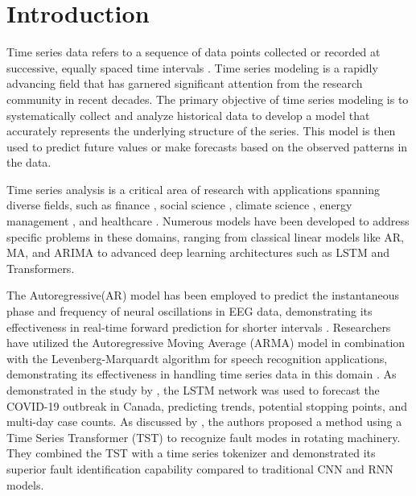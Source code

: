 \documentclass[sn-mathphys-num]{sn-jnl}
\theoremstyle{thmstyleone}%
\theoremstyle{thmstyletwo}%
\theoremstyle{thmstylethree}%
\begin{document}

\maketitle

\section{Introduction}\label{sec1}
Time series data refers to a sequence of data points collected or recorded at successive, equally spaced time intervals  \cite{adhikari2013introductory}. Time series modeling is a rapidly advancing field that has garnered significant attention from the research community in recent decades. The primary objective of time series modeling is to systematically collect and analyze historical data to develop a model that accurately represents the underlying structure of the series. This model is then used to predict future values or make forecasts based on the observed patterns in the data. 

Time series analysis is a critical area of research with applications spanning diverse fields, such as finance \cite{kim2011time}, social science \cite{box2014time}, climate science \cite{mudelsee2010climate}, energy management \cite{chou2018forecasting}, and healthcare \cite{gao2020time}. Numerous models have been developed to address specific problems in these domains, ranging from classical linear models like AR, MA, and ARIMA to advanced deep learning architectures such as LSTM and Transformers. 

The Autoregressive(AR) model has been employed to predict the instantaneous phase and frequency of neural oscillations in EEG data, demonstrating its effectiveness in real-time forward prediction for shorter intervals \cite{shakeel2020time}. Researchers have utilized the Autoregressive Moving Average (ARMA) model in combination with the Levenberg-Marquardt algorithm for speech recognition applications, demonstrating its effectiveness in handling time series data in this domain \cite{jafari2024speech}. As demonstrated in the study by \cite{chimmula2020time}, the LSTM network was used to forecast the COVID-19 outbreak in Canada, predicting trends, potential stopping points, and multi-day case counts. As discussed by \cite{jin2022time}, the authors proposed a method using a Time Series Transformer (TST) to recognize fault modes in rotating machinery. They combined the TST with a time series tokenizer and demonstrated its superior fault identification capability compared to traditional CNN and RNN models.
\end{document}
